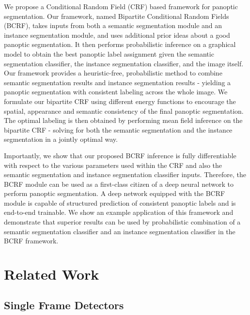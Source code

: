 We propose a Conditional Random Field (CRF) based framework for panoptic segmentation. Our framework, named Bipartite Conditional Random Fields (BCRF), takes inputs from both a semantic segmentation module and an instance segmentation module, and uses additional prior ideas about a good panoptic segmentation. It then performs probabilistic inference on a graphical model to obtain the best panoptic label assignment given the semantic segmentation classifier, the instance segmentation classifier, and the image itself. Our framework provides a heuristic-free, probabilistic method to combine semantic segmentation results and instance segmentation results - yielding a panoptic segmentation with consistent labeling across the whole image. We formulate our bipartite CRF using different energy functions to encourage the spatial, appearance and semantic consistency of the final panoptic segmentation. The optimal labeling is then obtained by performing mean field inference on the bipartite CRF - solving for both the semantic segmentation and the instance segmentation in a jointly optimal way.

Importantly, we show that our proposed BCRF inference is fully differentiable with respect to the various parameters used within the CRF and also the semantic segmentation and instance segmentation classifier inputs. Therefore, the BCRF module can be used as a first-class citizen of a deep neural network to perform panoptic segmentation. A deep network equipped with the BCRF module is capable of structured prediction of consistent panoptic labels and is end-to-end trainable. We show an example application of this framework and demonstrate that superior results can be used by probabilistic combination of a semantic segmentation classifier and an instance segmentation classifier in the BCRF framework.



\section{Related Work}

\subsection{Single Frame Detectors}

